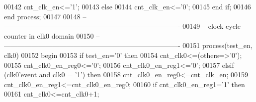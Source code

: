 \begin{DoxyCode}
00142         \textcolor{vhdlchar}{cnt_clk_en}\textcolor{vhdlchar}{<=}\textcolor{vhdlchar}{'}\textcolor{vhdllogic}{}\textcolor{vhdllogic}{1}\textcolor{vhdlchar}{'};
00143     \textcolor{keywordflow}{else}
00144         \textcolor{vhdlchar}{cnt_clk_en}\textcolor{vhdlchar}{<=}\textcolor{vhdlchar}{'}\textcolor{vhdllogic}{}\textcolor{vhdllogic}{0}\textcolor{vhdlchar}{'};
00145     \textcolor{keywordflow}{end} \textcolor{keywordflow}{if};
00146 \textcolor{keywordflow}{end} \textcolor{keywordflow}{process};
00147 
00148 \textcolor{keyword}{-- ----------------------------------------------------------------------------}
00149 \textcolor{keyword}{-- clock cycle counter in clk0 domain}
00150 \textcolor{keyword}{-- ----------------------------------------------------------------------------}
00151   \textcolor{keywordflow}{process}(test_en, clk0)
00152 \textcolor{vhdlkeyword}{    begin}
00153       \textcolor{keywordflow}{if} \textcolor{vhdlchar}{test_en}\textcolor{vhdlchar}{=}\textcolor{vhdlchar}{'}\textcolor{vhdllogic}{}\textcolor{vhdllogic}{0}\textcolor{vhdlchar}{'} \textcolor{keywordflow}{then}
00154             \textcolor{vhdlchar}{cnt_clk0}\textcolor{vhdlchar}{<=}\textcolor{vhdlchar}{(}\textcolor{keywordflow}{others}\textcolor{vhdlchar}{=}\textcolor{vhdlchar}{>}\textcolor{vhdlchar}{'}\textcolor{vhdllogic}{}\textcolor{vhdllogic}{0}\textcolor{vhdlchar}{'}\textcolor{vhdlchar}{)};
00155             \textcolor{vhdlchar}{cnt_clk0_en_reg0}\textcolor{vhdlchar}{<=}\textcolor{vhdlchar}{'}\textcolor{vhdllogic}{}\textcolor{vhdllogic}{0}\textcolor{vhdlchar}{'};
00156             \textcolor{vhdlchar}{cnt_clk0_en_reg1}\textcolor{vhdlchar}{<=}\textcolor{vhdlchar}{'}\textcolor{vhdllogic}{}\textcolor{vhdllogic}{0}\textcolor{vhdlchar}{'};
00157         \textcolor{keywordflow}{elsif} \textcolor{vhdlchar}{(}\textcolor{vhdlchar}{clk0}\textcolor{vhdlchar}{'}\textcolor{vhdlkeyword}{event} \textcolor{keywordflow}{and} \textcolor{vhdlchar}{clk0} \textcolor{vhdlchar}{=} \textcolor{vhdlchar}{'}\textcolor{vhdllogic}{}\textcolor{vhdllogic}{1}\textcolor{vhdlchar}{'}\textcolor{vhdlchar}{)} \textcolor{keywordflow}{then}
00158             \textcolor{vhdlchar}{cnt_clk0_en_reg0}\textcolor{vhdlchar}{<=}\textcolor{vhdlchar}{cnt_clk_en};
00159             \textcolor{vhdlchar}{cnt_clk0_en_reg1}\textcolor{vhdlchar}{<=}\textcolor{vhdlchar}{cnt_clk0_en_reg0};
00160           \textcolor{keywordflow}{if} \textcolor{vhdlchar}{cnt_clk0_en_reg1}\textcolor{vhdlchar}{=}\textcolor{vhdlchar}{'}\textcolor{vhdllogic}{}\textcolor{vhdllogic}{1}\textcolor{vhdlchar}{'} \textcolor{keywordflow}{then} 
00161                 \textcolor{vhdlchar}{cnt_clk0}\textcolor{vhdlchar}{<=}\textcolor{vhdlchar}{cnt_clk0}\textcolor{vhdlchar}{+}\textcolor{vhdllogic}{}\textcolor{vhdllogic}{1};

\end{DoxyCode}
